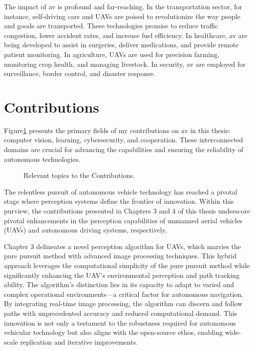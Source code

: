 The impact of \gls{av} is profound and far-reaching. In the transportation sector, for instance, self-driving cars and UAVs are poised to revolutionize the way people and goods are transported. These technologies promise to reduce traffic congestion, lower accident rates, and increase fuel efficiency. In healthcare, \gls{av} are being developed to assist in surgeries, deliver medications, and provide remote patient monitoring. In agriculture, UAVs are used for precision farming, monitoring crop health, and managing livestock. In security, \gls{av} are employed for surveillance, border control, and disaster response.





\newpage
\section{Contributions}


Figure\tildeAdd\ref{fig:as_topics} presents the primary fields of my contributions on \gls{av} in this thesis: computer vision, learning, cybersecurity, and cooperation. These interconnected domains are crucial for advancing the capabilities and ensuring the reliability of autonomous technologies.


\begin{figure}[h]
	\centering
	
	\caption{Relevant topics to the Contributions.}
	\label{fig:as_topics}
\end{figure}

The relentless pursuit of autonomous vehicle technology has reached a pivotal stage where perception systems define the frontier of innovation. Within this purview, the contributions presented in Chapters 3 and 4 of this thesis underscore pivotal enhancements in the perception capabilities of unmanned aerial vehicles (UAVs) and autonomous driving systems, respectively.

Chapter 3 delineates a novel perception algorithm for UAVs, which marries the pure pursuit method with advanced image processing techniques. This hybrid approach leverages the computational simplicity of the pure pursuit method while significantly enhancing the UAV's environmental perception and path tracking ability. The algorithm's distinction lies in its capacity to adapt to varied and complex operational environments—a critical factor for autonomous navigation. By integrating real-time image processing, the algorithm can discern and follow paths with unprecedented accuracy and reduced computational demand. This innovation is not only a testament to the robustness required for autonomous vehicular technology but also aligns with the open-source ethos, enabling wide-scale replication and iterative improvements.

